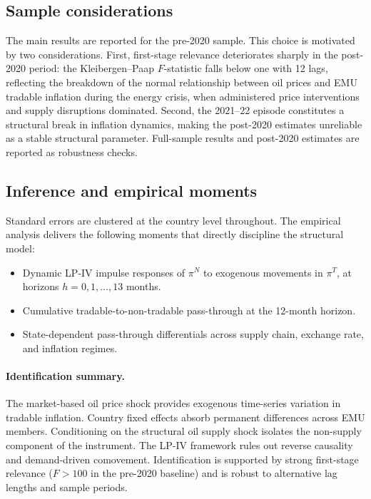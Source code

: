 \documentclass[11pt]{article}
\begin{document}
\subsection{Sample considerations}

The main results are reported for the pre-2020 sample. This choice is motivated by two considerations. First, first-stage relevance deteriorates sharply in the post-2020 period: the Kleibergen--Paap $F$-statistic falls below one with 12 lags, reflecting the breakdown of the normal relationship between oil prices and EMU tradable inflation during the energy crisis, when administered price interventions and supply disruptions dominated. Second, the 2021--22 episode constitutes a structural break in inflation dynamics, making the post-2020 estimates unreliable as a stable structural parameter. Full-sample results and post-2020 estimates are reported as robustness checks.

\subsection{Inference and empirical moments}

Standard errors are clustered at the country level throughout. The empirical analysis delivers the following moments that directly discipline the structural model:
\begin{itemize}
  \item Dynamic LP-IV impulse responses of $\pi^N$ to exogenous movements in $\pi^T$, at horizons $h = 0, 1, \dots, 13$ months.
  \item Cumulative tradable-to-non-tradable pass-through at the 12-month horizon.
  \item State-dependent pass-through differentials across supply chain, exchange rate, and inflation regimes.
\end{itemize}

\paragraph{Identification summary.} The market-based oil price shock provides exogenous time-series variation in tradable inflation. Country fixed effects absorb permanent differences across EMU members. Conditioning on the structural oil supply shock isolates the non-supply component of the instrument. The LP-IV framework rules out reverse causality and demand-driven comovement. Identification is supported by strong first-stage relevance ($F > 100$ in the pre-2020 baseline) and is robust to alternative lag lengths and sample periods.
\end{document}

